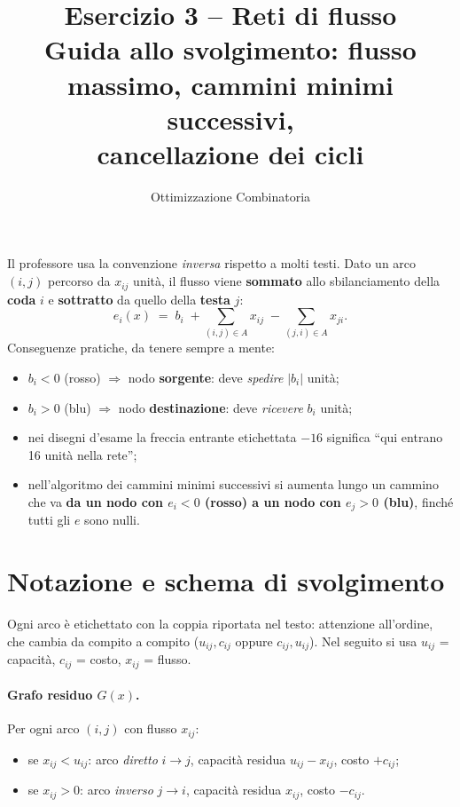 \documentclass[11pt,a4paper]{article}
\title{\textbf{Esercizio 3 -- Reti di flusso}\\[2mm]
\large Guida allo svolgimento: flusso massimo, cammini minimi successivi,\\ cancellazione dei cicli}
\author{Ottimizzazione Combinatoria}
\date{}
\begin{document}
\maketitle

\begin{tcolorbox}[colback=hl!12,colframe=hl!70!black,title=\textbf{ATTENZIONE: convenzione dei segni usata dal docente}]
Il professore usa la convenzione \emph{inversa} rispetto a molti testi. Dato un arco $(i,j)$
percorso da $x_{ij}$ unità, il flusso viene \textbf{sommato} allo sbilanciamento della
\textbf{coda} $i$ e \textbf{sottratto} da quello della \textbf{testa} $j$:
\[
 e_i(x)\;=\;b_i\;+\!\!\sum_{(i,j)\in A}\!\! x_{ij}\;-\!\!\sum_{(j,i)\in A}\!\! x_{ji}.
\]
Conseguenze pratiche, da tenere sempre a mente:
\begin{itemize}[nosep]
  \item $b_i<0$ (\textcolor{neg}{rosso}) $\Rightarrow$ nodo \textbf{sorgente}: deve \emph{spedire} $|b_i|$ unità;
  \item $b_i>0$ (\textcolor{pos}{blu}) $\Rightarrow$ nodo \textbf{destinazione}: deve \emph{ricevere} $b_i$ unità;
  \item nei disegni d'esame la freccia entrante etichettata $-16$ significa ``qui entrano 16 unità nella rete'';
  \item nell'algoritmo dei cammini minimi successivi si aumenta lungo un cammino che va
        \textbf{da un nodo con $e_i<0$ (rosso) a un nodo con $e_j>0$ (blu)}, finché tutti gli $e$ sono nulli.
\end{itemize}
\end{tcolorbox}

\section{Notazione e schema di svolgimento}

Ogni arco è etichettato con la coppia riportata nel testo: attenzione all'ordine, che cambia da
compito a compito ($u_{ij},c_{ij}$ oppure $c_{ij},u_{ij}$). Nel seguito si usa
$u_{ij}$ = capacità, $c_{ij}$ = costo, $x_{ij}$ = flusso.

\paragraph{Grafo residuo $G(x)$.} Per ogni arco $(i,j)$ con flusso $x_{ij}$:
\begin{itemize}[nosep]
  \item se $x_{ij}<u_{ij}$: arco \emph{diretto} $i\to j$, capacità residua $u_{ij}-x_{ij}$, costo $+c_{ij}$;
  \item se $x_{ij}>0$: arco \emph{inverso} $j\to i$, capacità residua $x_{ij}$, costo $-c_{ij}$.
\end{itemize}
\end{document}
